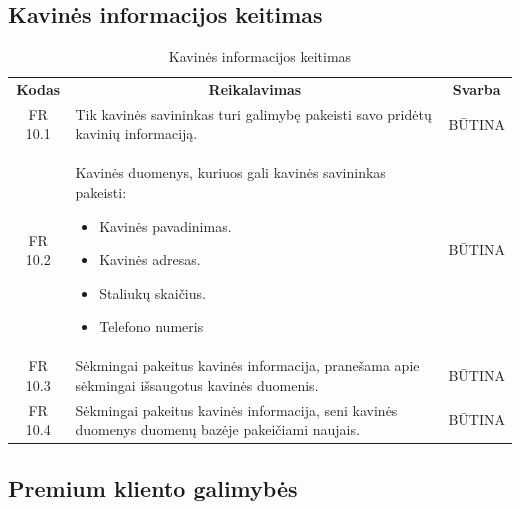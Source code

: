 \documentclass{VUMIFPSkursinis}
\begin{document}
\subsection{Kavinės informacijos keitimas}
\begin{center}
	\begin{table}[H]
	\caption{Kavinės informacijos keitimas}
	\begin{tabular}{|p{2cm}|p{}|p{}|}
	\hline
	    \rowcolor{lightgray}
		\multicolumn{3}{|c|}{Kavinės informacijos keitimas}\\
		
	\hline
		\multicolumn{1}{|c|}{{\bfseries Kodas}}&
		\multicolumn{1}{|c|}{{\bfseries Reikalavimas}}&
		\multicolumn{1}{|c|}{{\bfseries Svarba}}\\
	\hline 	
		\multicolumn{1}{|c|}{FR 10.1}&
		{Tik kavinės savininkas turi galimybę pakeisti savo pridėtų kavinių informaciją.}&
		\multicolumn{1}{|c|}{BŪTINA}\\
	
	\hline 	
		\multicolumn{1}{|c|}{FR 10.2}&
		{Kavinės duomenys, kuriuos gali kavinės savininkas pakeisti:
		\begin{itemize}
			\item Kavinės pavadinimas.
			\item Kavinės adresas.
			\item Staliukų skaičius.
			\item Telefono numeris
		\end{itemize}}&
		\multicolumn{1}{|c|}{BŪTINA}\\
	
	\hline 	
		\multicolumn{1}{|c|}{FR 10.3}&
		{Sėkmingai pakeitus kavinės informacija, pranešama apie sėkmingai išsaugotus kavinės duomenis.}&
		\multicolumn{1}{|c|}{BŪTINA}\\
	
	\hline 	
		\multicolumn{1}{|c|}{FR 10.4}&
		{Sėkmingai pakeitus kavinės informacija, seni kavinės duomenys duomenų bazėje pakeičiami naujais.}&
		\multicolumn{1}{|c|}{BŪTINA}\\
	
	\hline  
	
	
	\end{tabular}
	
	\label{table:Kavinėsinformacijoskeitimas}	
	\end{table}

\end{center}

\subsection{Premium kliento galimybės}
\end{document}
